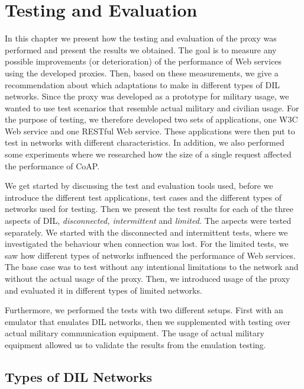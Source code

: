 \chapter{Testing and Evaluation}

\label{chapter:evaluation}

In this chapter we present how the testing and evaluation of the proxy was
performed and present the results we obtained.  The goal is to measure any
possible improvements (or deterioration) of the performance of Web services
using the developed proxies. Then, based on these measurements, we give a
recommendation about which adaptations to make in different types of DIL
networks. Since the proxy was developed as a prototype for military usage, we
wanted to use test scenarios that resemble actual military and civilian usage.
For the purpose of testing, we therefore developed two sets of applications, one
W3C Web service and one RESTful Web service. These applications were then put to
test in networks with different characteristics. In addition, we also performed
some experiments where we researched how the size of a single request affected
the performance of CoAP.


We get started by discussing the test and evaluation tools used, before we
introduce the different test applications, test cases and the different types of
networks used for testing. Then we present the test results for each of the
three aspects of DIL, \textit{disconnected, intermittent} and \textit{limited.}
The aspects were tested separately. We started with the disconnected and
intermittent tests, where we investigated the behaviour when connection was
lost. For the limited tests, we saw how different types of networks influenced
the performance of Web services. The base case was to test without any
intentional limitations to the network and without the actual usage of the
proxy. Then, we introduced usage of the proxy and evaluated it in different types
of limited networks.

Furthermore, we performed the tests with two different setups. First with an
emulator that emulates DIL networks, then we supplemented with testing over
actual military communication equipment. The usage of actual military equipment
allowed us to validate the results from the emulation testing.

\section{Types of DIL Networks}

